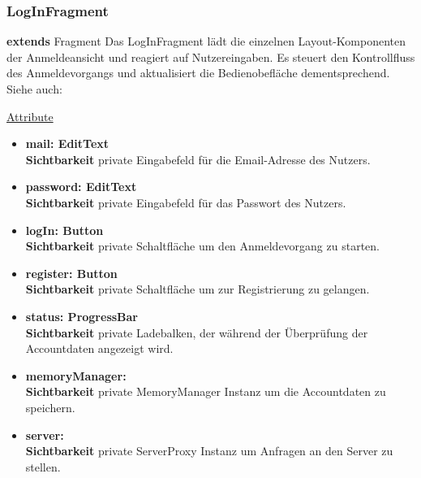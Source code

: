 \subsubsection{LogInFragment} \label{app:klasse:LogInFragment}
\textbf{extends} Fragment \newline
Das LogInFragment lädt die einzelnen Layout-Komponenten der Anmeldeansicht und reagiert auf Nutzereingaben. Es steuert den Kontrollfluss des Anmeldevorgangs und aktualisiert die Bedienobefläche dementsprechend.
\newline
Siehe auch: \newline

\underline{Attribute}
\begin{itemize}
\itemsep0pt
\item \textbf{mail: EditText} \hfill\\ 
\textbf{Sichtbarkeit} private \newline
Eingabefeld für die Email-Adresse des Nutzers.

\item \textbf{password: EditText} \hfill\\ 
\textbf{Sichtbarkeit} private \newline
Eingabefeld für das Passwort des Nutzers.

\item \textbf{logIn: Button} \hfill\\ 
\textbf{Sichtbarkeit} private \newline
Schaltfläche um den Anmeldevorgang zu starten.

\item \textbf{register: Button} \hfill\\ 
\textbf{Sichtbarkeit} private \newline
Schaltfläche um zur Registrierung zu gelangen.

\item \textbf{status: ProgressBar} \hfill\\ 
\textbf{Sichtbarkeit} private \newline
Ladebalken, der während der Überprüfung der Accountdaten angezeigt wird.

\item \textbf{memoryManager: } \hfill\\ 
\textbf{Sichtbarkeit} private \newline
MemoryManager Instanz um die Accountdaten zu speichern.

\item \textbf{server: } \hfill\\ 
\textbf{Sichtbarkeit} private \newline
ServerProxy Instanz um Anfragen an den Server zu stellen.


\end{itemize}
